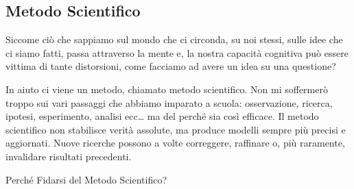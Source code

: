 \documentclass[12pt]{book} %
\begin{document}
\subsection{Metodo Scientifico}
Siccome ciò che sappiamo sul mondo che ci circonda, su noi stessi, sulle idee che ci siamo fatti, passa attraverso
la mente e, la nostra capacità cognitiva può essere vittima di tante distorsioni, come facciamo ad avere un idea su una
questione?

In aiuto ci viene un metodo, chiamato metodo scientifico. Non mi soffermerò troppo sui vari passaggi che abbiamo
imparato a scuola: osservazione, ricerca, ipotesi, esperimento, analisi ecc… ma del perché sia così efficace. Il metodo scientifico non stabilisce verità assolute, ma produce modelli sempre più precisi e aggiornati. Nuove ricerche possono a volte correggere, raffinare o, più raramente, invalidare risultati precedenti.

Perché Fidarsi del Metodo Scientifico? 
\end{document}
